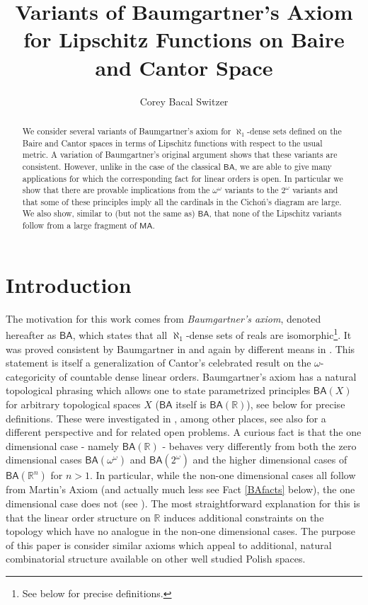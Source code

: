 \documentclass[leqno,11pt]{amsart}
\title{Variants of Baumgartner's Axiom for Lipschitz Functions on Baire and Cantor Space}
\author[Switzer]{Corey Bacal Switzer}
\theoremstyle{definition}
\theoremstyle{remark}
\def\MA{\mathsf{MA}}
\def\BA{\mathsf{BA}}
\def\baire{\omega^\omega}
\def\cantor{2^\omega}
\begin{document}
\begin{abstract}
   We consider several variants of Baumgartner's axiom for $\aleph_1$-dense sets defined on the Baire and Cantor spaces in terms of Lipschitz functions with respect to the usual metric. A variation of Baumgartner's original argument shows that these variants are consistent. However, unlike in the case of the classical $\BA$, we are able to give many applications for which the corresponding fact for linear orders is open. In particular we show that there are provable implications from the $\baire$ variants to the $\cantor$ variants and that some of these principles imply all the cardinals in the Cicho\'{n}'s diagram are large. We also show, similar to (but not the same as) $\BA$, that none of the Lipschitz variants follow from a large fragment of $\MA$. 
\end{abstract}

\maketitle

\section{Introduction}
The motivation for this work comes from {\em Baumgartner's axiom}, denoted hereafter as $\BA$, which states that all $\aleph_1$-dense sets of reals are isomorphic\footnote{See below for precise definitions.}. It was proved consistent by Baumgartner in \cite{Baum73} and again by different means in \cite{BaumPFA}. This statement is itself a generalization of Cantor's celebrated result on the $\omega$-categoricity of countable dense linear orders. Baumgartner's axiom has a natural topological phrasing which allows one to state parametrized principles $\BA (X)$ for arbitrary topological spaces $X$ ($\BA$ itself is $\BA (\mathbb R)$), see below for precise definitions. These were investigated in \cite{Stepranswatson87}, \cite{BaldwinBeaudoin89} among other places, see also \cite{weakBA} for a different perspective and \cite[Section 3.5]{QsCDH} for related open problems. A curious fact is that the one dimensional case - namely $\BA (\mathbb R)$ -  behaves very differently from both the zero dimensional cases $\BA (\baire)$ and $\BA (\cantor)$ and the higher dimensional cases of $\BA (\mathbb R^n)$ for $n > 1$. In particular, while the non-one dimensional cases all follow from Martin's Axiom (and actually much less see Fact \ref{BAfacts} below), the one dimensional case does not (see \cite{AvrahamShelah81}). The most straightforward explanation for this is that the linear order structure on $\mathbb R$ induces additional constraints on the topology which have no analogue in the non-one dimensional cases. The purpose of this paper is consider similar axioms which appeal to additional, natural combinatorial structure available on other well studied Polish spaces. 
\end{document}

